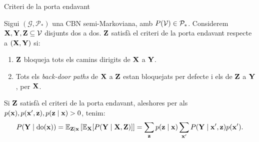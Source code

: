 \documentclass{bestbeamer}
\begin{document}
\begin{frame}{Criteri de la porta endavant}
\begin{definition}\label{def:front-door}
Sigui $(\mathcal{G},\mathcal{P}_*)$ una CBN semi-Markoviana, amb $P(\mathcal{V})\in\mathcal{P}_*$. Considerem $\mathbf{X},\mathbf{Y},\mathbf{Z}\subseteq \mathcal{V}$ disjunts dos a dos. $\mathbf{Z}$ satisfà el criteri de la porta endavant respecte a $(\mathbf{X},\mathbf{Y})$ si:
\begin{enumerate}
    \item $\mathbf{Z}$ bloqueja tots els camins dirigits de $\mathbf{X}$ a $\mathbf{Y}$.
    \item Tots els \textit{back-door paths} de $\mathbf{X}$ a $\mathbf{Z}$ estan bloquejats per defecte i els de $\mathbf{Z}$ a $\mathbf{Y}$, per $\mathbf{X}$.
\end{enumerate}
\end{definition}
\begin{theorem}\label{thm:front-door}
Si $\mathbf{Z}$ satisfà el criteri de la porta endavant, aleshores per als $p(\mathbf{x}),p(\mathbf{x}',\mathbf{z}),p(\mathbf{z}\mid\mathbf{x})>0$, tenim:
{\footnotesize\begin{equation*}
    P(\mathbf{Y}\mid \operatorname{do}(\mathbf{x}))=\mathbb{E}_{\mathbf{Z} \mid \mathbf{x}}\left[\mathbb{E}_{\mathbf{X}}[P(\mathbf{Y} \mid \mathbf{X}, \mathbf{Z})]\right]=\sum_{\mathbf{z}} p(\mathbf{z}\mid\mathbf{x})\sum_{\mathbf{x}'}P(\mathbf{Y}\mid \mathbf{x}',\mathbf{z})p(\mathbf{x}').
\end{equation*}}
\end{theorem}
\end{frame}
\end{document}
